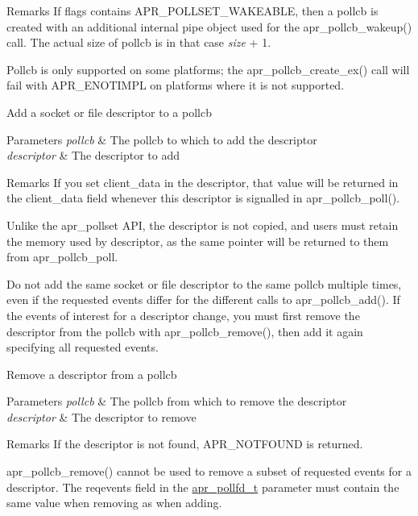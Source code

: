 \begin{DoxyRemark}{Remarks}
If flags contains A\+P\+R\+\_\+\+P\+O\+L\+L\+S\+E\+T\+\_\+\+W\+A\+K\+E\+A\+B\+LE, then a pollcb is created with an additional internal pipe object used for the apr\+\_\+pollcb\+\_\+wakeup() call. The actual size of pollcb is in that case {\itshape size} + 1. 

Pollcb is only supported on some platforms; the apr\+\_\+pollcb\+\_\+create\+\_\+ex() call will fail with A\+P\+R\+\_\+\+E\+N\+O\+T\+I\+M\+PL on platforms where it is not supported.
\end{DoxyRemark}
Add a socket or file descriptor to a pollcb 
\begin{DoxyParams}{Parameters}
{\em pollcb} & The pollcb to which to add the descriptor \\
\hline
{\em descriptor} & The descriptor to add \\
\hline
\end{DoxyParams}
\begin{DoxyRemark}{Remarks}
If you set client\+\_\+data in the descriptor, that value will be returned in the client\+\_\+data field whenever this descriptor is signalled in apr\+\_\+pollcb\+\_\+poll(). 

Unlike the apr\+\_\+pollset A\+PI, the descriptor is not copied, and users must retain the memory used by descriptor, as the same pointer will be returned to them from apr\+\_\+pollcb\+\_\+poll. 

Do not add the same socket or file descriptor to the same pollcb multiple times, even if the requested events differ for the different calls to apr\+\_\+pollcb\+\_\+add(). If the events of interest for a descriptor change, you must first remove the descriptor from the pollcb with apr\+\_\+pollcb\+\_\+remove(), then add it again specifying all requested events.
\end{DoxyRemark}
Remove a descriptor from a pollcb 
\begin{DoxyParams}{Parameters}
{\em pollcb} & The pollcb from which to remove the descriptor \\
\hline
{\em descriptor} & The descriptor to remove \\
\hline
\end{DoxyParams}
\begin{DoxyRemark}{Remarks}
If the descriptor is not found, A\+P\+R\+\_\+\+N\+O\+T\+F\+O\+U\+ND is returned. 

apr\+\_\+pollcb\+\_\+remove() cannot be used to remove a subset of requested events for a descriptor. The reqevents field in the \hyperlink{structapr__pollfd__t}{apr\+\_\+pollfd\+\_\+t} parameter must contain the same value when removing as when adding.
\end{DoxyRemark}
